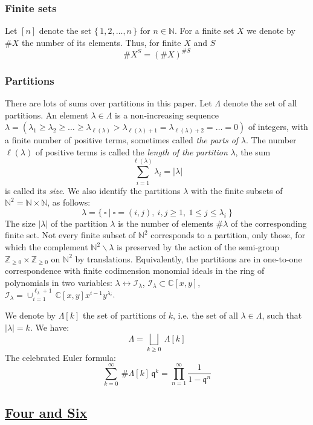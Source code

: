 \documentclass[12pt]{amsart}
\newcommand {\3}{\underline{\bf 3}}
\newcommand {\4}{\underline{\bf 4}}
\newcommand {\6}{\underline{\bf 6}}
\newcommand{\beq}{\begin{equation}}
\newcommand{\eeq}{\end{equation}}
\newcommand {\BC}   {\mathbb C}
\newcommand {\BN}   {\mathbb N}
\newcommand {\qe} {\mathfrak q}
\newcommand {\BZ}   {\mathbb Z}
\newcommand {\CalI} {\mathcal I}
\newcommand{\subsec}[1]{\subsection{\underline{\bf #1}}}
\begin{document}
\subsubsection{Finite sets}
Let $[n]$ denote the set $\{ \, 1, 2, \ldots , n \, \}$ for $n \in {\BN}$.
For a finite set $X$ we denote by ${\#}X$ the number of its elements. Thus, for finite $X$ and $S$ 
\beq
{\#} X^{S} = \left( {\#}X \right)^{{\#}S}
\eeq

 

\subsubsection{Partitions}
There are lots of sums over partitions in this paper. 
Let $\Lambda$ denote the set of all partitions. 
An element ${\lambda} \in \Lambda$ is a non-increasing sequence ${\lambda} = ({\lambda}_{1} \geq {\lambda}_{2} \geq \ldots \geq {\lambda}_{{\ell}({\lambda})} > {\lambda}_{{\ell}({\lambda})+1} = {\lambda}_{{\ell}({\lambda})+2} = \ldots = 0  )$ of integers, with a finite number of positive terms, sometimes called {\it the parts of} ${\lambda}$. The number ${\ell}({\lambda})$ of positive terms is called the {\it length of the partition} $\lambda$, the sum
\beq
\sum_{i=1}^{{\ell}({\lambda})} {\lambda}_{i} = | {\lambda} |
\eeq
is called its {\it size}. We also identify the partitions $\lambda$ with the finite subsets of ${\BN}^{2} = {\BN} \times {\BN}$, as follows:
\beq
{\lambda} = \{ \ {\square} \ | \ {\square} = (i,j), \ i, j \geq 1, \ 1\leq j \leq {\lambda}_{i} \ \}
\label{eq:lamset}
\eeq  
The size $| {\lambda} |$ of the partition $\lambda$ is the number of elements ${\#}{\lambda}$ of the corresponding finite set. 
Not every finite subset of ${\BN}^{2}$ corresponds to a partition, only those, for which the complement ${\BN}^{2} \backslash {\lambda}$ is preserved by the action of the semi-group ${\BZ}_{\geq 0} \times {\BZ}_{\geq 0}$ on ${\BN}^{2}$ by translations. Equivalently, the partitions are in one-to-one correspondence with finite codimension monomial ideals in the ring of polynomials in two variables: ${\lambda} \leftrightarrow {\CalI}_{\lambda}$, ${\CalI}_{\lambda} \subset {\BC}[x,y]$, ${\CalI}_{\lambda} = \cup_{i=1}^{{\ell}_{\lambda}+1} \, {\BC}[x,y] x^{i-1}y^{{\lambda}_{i}}$.

We denote by ${\Lambda}[k]$ the set of partitions of $k$, i.e. the set of all ${\lambda} \in {\Lambda}$, such that $|{\lambda}| = k$. We have:
\beq
{\Lambda} = \bigsqcup\limits_{k \geq 0} \ {\Lambda}[k]
\label{eq:lambdec}
\eeq
The celebrated Euler formula:
\beq
\sum_{k=0}^{\infty} \ \#{\Lambda}[k] \, {\qe}^{k} = \prod_{n=1}^{\infty} \frac{1}{1-{\qe}^{n}}
\eeq
\subsec{Four and Six}
\end{document}
